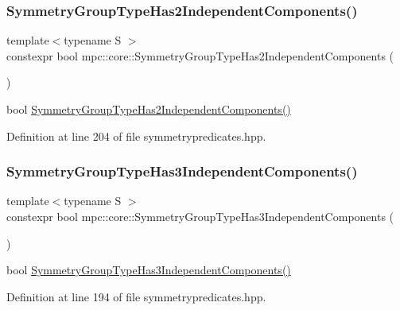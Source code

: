 \subsubsection{\texorpdfstring{Symmetry\+Group\+Type\+Has2\+Independent\+Components()}{SymmetryGroupTypeHas2IndependentComponents()}}
{\footnotesize\ttfamily template$<$typename S $>$ \\
constexpr bool mpc\+::core\+::\+Symmetry\+Group\+Type\+Has2\+Independent\+Components (\begin{DoxyParamCaption}{ }\end{DoxyParamCaption})\hspace{0.3cm}{\ttfamily [inline]}}

bool \mbox{\hyperlink{namespacempc_1_1core_a5ff452bd2a36ed7bfbaff4e81d07290f}{Symmetry\+Group\+Type\+Has2\+Independent\+Components()}} 

Definition at line 204 of file symmetrypredicates.\+hpp.

\mbox{\label{namespacempc_1_1core_a7ad5874b01d418427d2f88e392213289}} 
\subsubsection{\texorpdfstring{Symmetry\+Group\+Type\+Has3\+Independent\+Components()}{SymmetryGroupTypeHas3IndependentComponents()}}
{\footnotesize\ttfamily template$<$typename S $>$ \\
constexpr bool mpc\+::core\+::\+Symmetry\+Group\+Type\+Has3\+Independent\+Components (\begin{DoxyParamCaption}{ }\end{DoxyParamCaption})\hspace{0.3cm}{\ttfamily [inline]}}

bool \mbox{\hyperlink{namespacempc_1_1core_a7ad5874b01d418427d2f88e392213289}{Symmetry\+Group\+Type\+Has3\+Independent\+Components()}} 

Definition at line 194 of file symmetrypredicates.\+hpp.

\mbox{\label{namespacempc_1_1core_acb4d9bceab008077200a0a4c9ab91c69}} 

